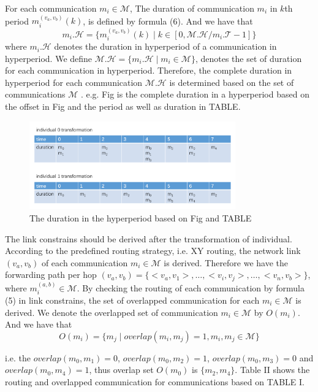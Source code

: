 \documentclass[conference]{IEEEtran}
\begin{document}
For each communication $m_{i}\in \mathcal{M}$, The duration of communication $m_{i}$ in $\mathit{k}$th period ${m_{i}^{(v_{a},v_{b})}}(k)$, is defined by formula (6). And we have that
\begin{equation}
m_{i}.\mathcal{H} = \{ {m_{i}^{(v_{a},v_{b})}}(k) \mid k \in [0, \mathcal{M.H} / m_{i}.\mathcal{T} - 1] \}
\end{equation}
where $m_{i}.\mathcal{H}$ denotes the duration in hyperperiod of a communication in hyperperiod.
We define $\mathcal{M.H}=\{ m_{i}.\mathcal{H} \mid m_{i}\in \mathcal{M} \}$, denotes the set of duration for each communication in hyperperiod. 
Therefore, the complete duration in hyperperiod for each communication $\mathcal{M.H}$ is determined based on the set of communications $\mathcal{M}$ . e.g. Fig is the complete duration in a hyperperiod based on the offset in Fig and the period as well as duration in TABLE.

\begin{figure}[!t]
	\centering
	\includegraphics[width=3.5in]{picture/individual_transformation.pdf}
	\caption{The duration in the hyperperiod based on Fig and TABLE}
	\label{duration in hyperperiod fig}
\end{figure}

The link constrains should be derived after the transformation of individual. According to the predefined routing strategy, i.e. XY routing, the network link $(v_{a},v_{b})$ of each communication $m_{i}\in\mathcal{M}$ is derived. Therefore we have the forwarding path per hop $ (v_{a},v_{b})=\{ <v_{a},v_{1}> ,\dots, <v_{i},v_{j}> ,\dots, <v_{n},v_{b}> \} $, where $m_{i}^{(a,b)}\in\mathcal{M}$. By checking the routing of each communication by formula (5) in link constrains, the set of overlapped communication for each $m_{i}\in\mathcal{M}$ is derived. We denote the overlapped set of communication $m_{i}\in \mathcal{M}$ by $O(m_i)$. And we have that
\begin{equation}
	O(m_i) = \{ m_j \mid overlap(m_i,m_j)=1,m_i,m_j\in\mathcal{M}  \}
\end{equation}

 i.e. the $overlap(m_{0},m_{1})=0$, $overlap(m_{0},m_{2})=1$, $overlap(m_{0},m_{3})=0$ and $overlap(m_{0},m_{4})=1$, thus overlap set $O(m_{0})$ is $\{ m_{2},m_{4} \}$. Table II shows the routing and overlapped communication for communications based on TABLE I.
\end{document}
